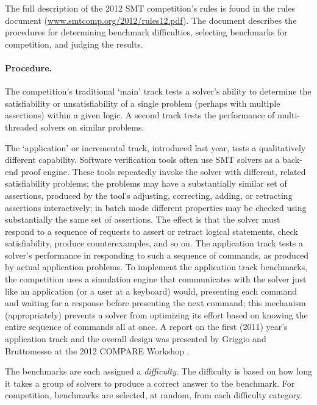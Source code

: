 \documentclass{llncs}
\begin{document}
The full description of the 2012 SMT competition's rules is found in the rules document (\url{www.smtcomp.org/2012/rules12.pdf}). The document describes the procedures for determining benchmark difficulties, selecting benchmarks for competition, and judging the results.

\paragraph{Procedure.} 

The competition's traditional `main' track tests a solver's ability to determine the satisfiability or unsatisfiability of a single problem (perhaps with multiple assertions) within a given logic. A second track tests the performance of multi-threaded solvers on similar problems.

The `application' or incremental track, introduced last year, tests a qualitatively different capability. Software verification tools often use SMT solvers as a back-end proof engine. These tools repeatedly invoke the solver with different, related satisfiability problems; the problems may have a substantially similar set of assertions, produced by the tool's adjusting, correcting, adding, or retracting assertions interactively; in batch mode different properties may be checked using substantially the same set of assertions.
The effect is that the solver must respond to a sequence of requests to assert or retract logical statements, check satisfiability, produce counterexamples, and so on. The application track tests a solver's performance in responding to such a sequence of commands, as produced by actual application problems. To implement the application track benchmarks, the 
competition uses a simulation engine that communicates with the solver just like an application (or a user at a keyboard) would, presenting each command and waiting for a response before presenting the next command; this mechanism (appropriately) prevents a solver from optimizing its effort based on knowing the entire sequence of commands all at once. A report
on the first (2011) year's application track and the overall design was presented by Griggio and Bruttomesso at the 
2012 COMPARE Workshop \cite{ag+rb+12}.

The benchmarks are each assigned a {\em difficulty}. The difficulty is based on how long it takes a group of solvers to produce a correct answer to the benchmark. For competition, benchmarks are selected, at random, from each difficulty category. 
\end{document}
